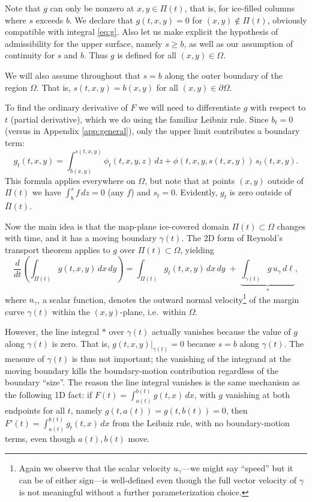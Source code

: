 \documentclass[11pt]{amsart}
\theoremstyle{definition}
\begin{document}
Note that $g$ can only be nonzero at $x,y \in \Pi(t)$, that is, for ice-filled columns where $s$ exceeds $b$.  We declare that $g(t,x,y)=0$ for $(x,y) \notin \Pi(t)$, obviously compatible with integral \eqref{eq:g}.  Also let us make explicit the hypothesis of admissibility for the upper surface, namely $s\ge b$, as well as our assumption of continuity for $s$ and $b$.  Thus $g$ is defined for all $(x,y)\in\Omega$.

We will also assume throughout that $s=b$ along the outer boundary of the region $\Omega$.  That is, $s(t,x,y)=b(x,y)$ for all $(x,y) \in \partial \Omega$.

To find the ordinary derivative of $F$ we will need to differentiate $g$ with respect to $t$ (partial derivative), which we do using the familiar Leibniz rule.  Since $b_t=0$ (versus in Appendix \ref{app:general}), only the upper limit contributes a boundary term:
    $$g_t(t,x,y) = \int_{b(x,y)}^{s(t,x,y)} \phi_t(t,x,y,z)\,dz + \phi(t,x,y,s(t,x,y))\, s_t(t,x,y).$$
This formula applies everywhere on $\Omega$, but note that at points $(x,y)$ outside of $\Pi(t)$ we have $\int_b^s f \,dz=0$ (any $f$) and $s_t=0$.  Evidently, $g_t$ is zero outside of $\bar\Pi(t)$.

Now the main idea is that the map-plane ice-covered domain $\Pi(t) \subset \Omega$ changes with time, and it has a moving boundary $\gamma(t)$.  The 2D form of Reynold's transport theorem \cite{Holmes2019} applies to $g$ over $\Pi(t)\subset \Omega$, yielding
\begin{equation}
\frac{d}{dt}\left(\int_{\Pi(t)} g(t,x,y)\,dx\,dy\right) = \int_{\Pi(t)} g_t(t,x,y)\,dx\,dy \;+\; \underbrace{\int_{\gamma(t)} g\, u_\gamma \, d\ell}_{\ast},  \label{eq:reynoldstwod}
\end{equation}
where $u_\gamma$, a scalar function, denotes the outward normal velocity\footnote{Again we observe that the scalar velocity $u_\gamma$---we might say ``speed'' but it can be of either sign---is well-defined even though the full vector velocity of $\gamma$ is not meaningful without a further parameterization choice.} of the margin curve $\gamma(t)$ within the $(x,y)$-plane, i.e.~within $\Omega$.

However, the line integral $\ast$ over $\gamma(t)$ actually vanishes because the value of $g$ along $\gamma(t)$ is zero.  That is, $g(t,x,y)\big|_{\gamma(t)} = 0$ because $s=b$ along $\gamma(t)$.  The measure of $\gamma(t)$ is thus not important; the vanishing of the integrand at the moving boundary kills the boundary-motion contribution regardless of the boundary ``size''.  The reason the line integral vanishes is the same mechanism as the following 1D fact: if $F(t)=\int_{a(t)}^{b(t)} g(t,x)\,dx$, with $g$ vanishing at both endpoints for all $t$, namely $g(t,a(t))=g(t,b(t))=0$, then $F'(t) = \int_{a(t)}^{b(t)} g_t(t,x)\,dx$ from the Leibniz rule, with no boundary-motion terms, even though $a(t),b(t)$ move.  
\end{document}
